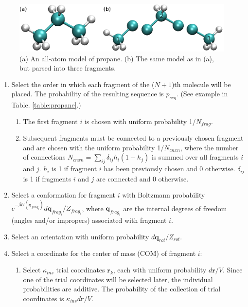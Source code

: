 \begin{figure}[h]
	\centering
	\includegraphics[width=0.99\textwidth]{c3.eps}
	\caption{(a) An all-atom model of propane. (b) The same model as in (a), but parsed into three fragments.}
	\label{fig:propaneFragments}
\end{figure}


\begin{enumerate}
  \item Select the order in which each fragment of the ($N+1$)th molecule will be placed. The probability of the resulting sequence is $p_{seq}$. (See example in Table. \ref{table:propane}.)
  \begin{enumerate}
		\item The first fragment $i$ is chosen with uniform probability 1/$N_{frag}$.
    \item Subsequent fragments must be connected to a previously chosen fragment and are chosen with the uniform probability 1/$N_{cnxn}$, where the number of connections $N_{cnxn}= \sum_{ij}{\delta_{ij} h_{i} (1-h_{j})}$ is summed over all fragments $i$ and $j$. $h_i$ is 1 if fragment $i$ has been previously chosen and 0 otherwise. $\delta_{ij}$ is 1 if fragments $i$ and $j$ are connected and 0 otherwise.
  \end{enumerate}
	\item Select a conformation for fragment $i$ with Boltzmann probability \newline $e^{-\beta U(\mathbf{q}_{frag_i})}d\mathbf{q}_{frag_i}/Z_{frag_i}$, where $\mathbf{q}_{frag_i}$ are the internal degrees of freedom (angles and/or impropers) associated with fragment $i$.
	\item Select an orientation with uniform probability $d\mathbf{q}_{rot}/Z_{rot}$. 
	\item Select a coordinate for the center of mass (COM) of fragment $i$:
	\begin{enumerate}
		\item Select $\kappa_{ins}$ trial coordinates $\mathbf{r}_k$, each with uniform probability $d\mathbf{r}/V$. Since one of the trial coordinates will be selected later, the individual probabilities are additive. The probability of the collection of trial coordinates is $\kappa_{ins}d\mathbf{r}/V$.

\end{enumerate}
\end{enumerate}
